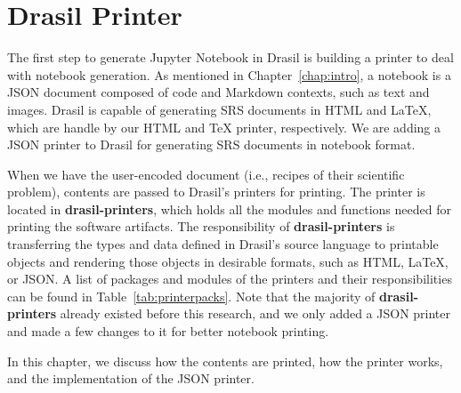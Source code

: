 \chapter{Drasil Printer} \label{chap:nbprinter}
The first step to generate Jupyter Notebook in Drasil is building a printer to 
deal with notebook generation. As mentioned in Chapter~\ref{chap:intro}, a 
notebook is a JSON document composed of code and Markdown contexts, such as 
text and images. Drasil is capable of generating SRS documents in HTML and 
LaTeX, which are handle by our HTML and TeX printer, respectively. We are 
adding a JSON printer to Drasil for generating SRS documents in notebook format.

When we have the user-encoded document (i.e., recipes of their scientific 
problem), contents are passed to Drasil's printers for printing. 
The printer is located in \textbf{drasil-printers}, which holds all the 
modules and functions needed for printing the software artifacts. The 
responsibility of \textbf{drasil-printers} is transferring the types and data
defined in Drasil's source language to printable objects and rendering those 
objects in desirable formats, such as HTML, LaTeX, or JSON. A list of packages 
and modules of the printers and their responsibilities can be found in 
Table~\ref{tab:printerpacks}. Note that the majority of 
\textbf{drasil-printers} already existed before this research, and we only 
added a JSON printer and made a few changes to it for better notebook printing.

In this chapter, we discuss how the contents are printed, how the printer 
works, and the implementation of the JSON printer.

